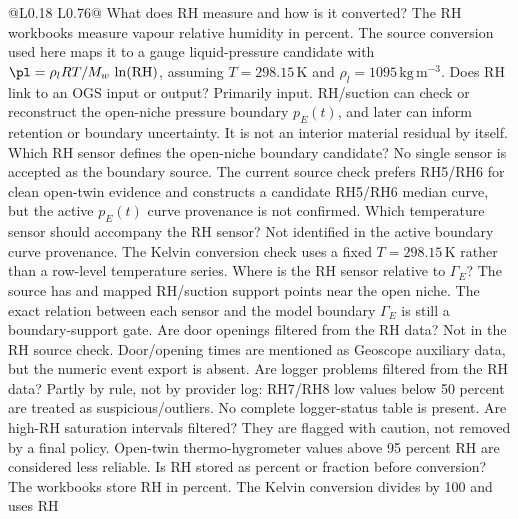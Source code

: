 \begin{longtable}{@{}L{0.18\textwidth} L{0.76\textwidth}@{}}
\toprule
{}
{ What does RH measure and how is it converted?}
{The RH workbooks measure vapour relative humidity in percent.  The source
conversion used here maps it to a gauge liquid-pressure candidate with
\(\pl=\rho_lRT/M_w\,\ln(\mathrm{RH})\), assuming \(T=298.15\,\mathrm{K}\) and
\(\rho_l=1095\,\mathrm{kg\,m^{-3}}\).}
{ Does RH link to an OGS input or output?}
{Primarily input.  RH/suction can check or reconstruct the open-niche pressure
boundary \(p_E(t)\), and later can inform retention or boundary uncertainty.  It
is not an interior material residual by itself.}
{ Which RH sensor defines the open-niche boundary candidate?}
{No single sensor is accepted as the boundary source.  The current source check prefers RH5/RH6 for
clean open-twin evidence and constructs a candidate RH5/RH6 median curve, but the
active \(p_E(t)\) curve provenance is not confirmed.}
{ Which temperature sensor should accompany the RH sensor?}
{Not identified in the active boundary curve provenance.  The Kelvin conversion check uses
a fixed \(T=298.15\,\mathrm{K}\) rather than a row-level temperature series.}
{ Where is the RH sensor relative to \(\Gamma_E\)?}
{The source has  and mapped RH/suction support points near the
open niche.  The exact relation between each sensor and the model boundary
\(\Gamma_E\) is still a boundary-support gate.}
{ Are door openings filtered from the RH data?}
{Not in the RH source check.  Door/opening times are mentioned as Geoscope auxiliary
data, but the numeric event export is absent.}
{ Are logger problems filtered from the RH data?}
{Partly by rule, not by provider log: RH7/RH8 low values below 50 percent are treated
as suspicious/outliers.  No complete logger-status table is present.}
{ Are high-RH saturation intervals filtered?}
{They are flagged with caution, not removed by a final policy.  Open-twin
thermo-hygrometer values above 95 percent RH are considered less reliable.}
{ Is RH stored as percent or fraction before conversion?}
{The workbooks store RH in percent.  The Kelvin conversion divides by 100 and uses RH
}
\end{longtable}
